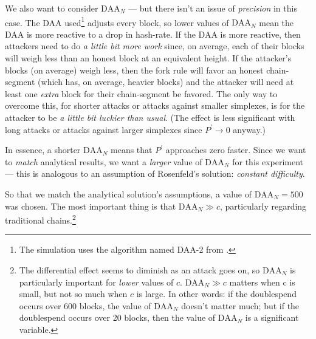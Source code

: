 We also want to consider $\text{DAA}_N$ --- but there isn't an issue of \emph{precision} in this case.
The DAA used\footnote{
    The simulation uses the algorithm named \textsc{DAA-2} from \citeDaaTwoLink{}.
} adjusts every block, so lower values of $\text{DAA}_N$ mean the DAA is more reactive to a drop in hash-rate.
If the DAA is more reactive, then attackers need to do \emph{a little bit more work} since, on average, each of their blocks will weigh less than an honest block at an equivalent height.
If the attacker's blocks (on average) weigh less, then the fork rule will favor an honest chain-segment (which has, on average, heavier blocks) and the attacker will need at least one \emph{extra} block for their chain-segment be favored.
The only way to overcome this, for shorter attacks or attacks against smaller simplexes, is for the attacker to be \emph{a little bit luckier than usual}.
(The effect is less significant with long attacks or attacks against larger simplexes since $P^\prime \to 0$ anyway.)


In essence, a shorter $\text{DAA}_N$ means that $P^\prime$ approaches zero faster.
Since we want to \emph{match} analytical results, we want a \emph{larger} value of $\text{DAA}_N$ for this experiment --- this is analogous to an assumption of Rosenfeld's solution: \emph{constant difficulty}.

So that we match the analytical solution's assumptions, a value of $\text{DAA}_N = 500$ was chosen.
The most important thing is that $\text{DAA}_N \gg c$, particularly regarding traditional chains.\footnote{
    The differential effect seems to diminish as an attack goes on, so $\text{DAA}_N$ is particularly important for \emph{lower} values of $c$.
    $\text{DAA}_N \gg c$ matters when c is small, but not so much when $c$ is large.
    In other words: if the doublespend occurs over 600 blocks, the value of $\text{DAA}_N$ doesn't matter much; but if the doublespend occurs over 20 blocks, then the value of $\text{DAA}_N$ is a significant variable.
}


